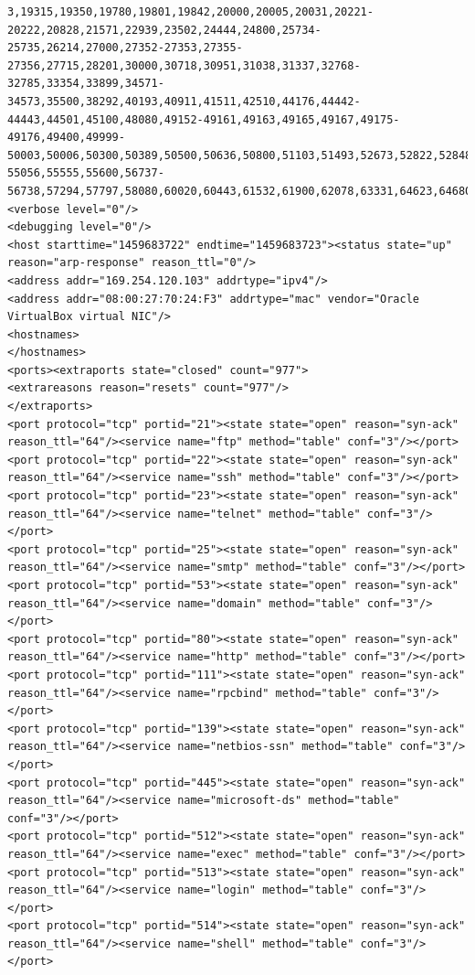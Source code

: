 \documentclass[10pt,a4paper]{report}
\begin{document}
\begin{verbatim}
3,19315,19350,19780,19801,19842,20000,20005,20031,20221-20222,20828,21571,22939,23502,24444,24800,25734-25735,26214,27000,27352-27353,27355-27356,27715,28201,30000,30718,30951,31038,31337,32768-32785,33354,33899,34571-34573,35500,38292,40193,40911,41511,42510,44176,44442-44443,44501,45100,48080,49152-49161,49163,49165,49167,49175-49176,49400,49999-50003,50006,50300,50389,50500,50636,50800,51103,51493,52673,52822,52848,52869,54045,54328,55055-55056,55555,55600,56737-56738,57294,57797,58080,60020,60443,61532,61900,62078,63331,64623,64680,65000,65129,65389"/>
<verbose level="0"/>
<debugging level="0"/>
<host starttime="1459683722" endtime="1459683723"><status state="up" reason="arp-response" reason_ttl="0"/>
<address addr="169.254.120.103" addrtype="ipv4"/>
<address addr="08:00:27:70:24:F3" addrtype="mac" vendor="Oracle VirtualBox virtual NIC"/>
<hostnames>
</hostnames>
<ports><extraports state="closed" count="977">
<extrareasons reason="resets" count="977"/>
</extraports>
<port protocol="tcp" portid="21"><state state="open" reason="syn-ack" reason_ttl="64"/><service name="ftp" method="table" conf="3"/></port>
<port protocol="tcp" portid="22"><state state="open" reason="syn-ack" reason_ttl="64"/><service name="ssh" method="table" conf="3"/></port>
<port protocol="tcp" portid="23"><state state="open" reason="syn-ack" reason_ttl="64"/><service name="telnet" method="table" conf="3"/></port>
<port protocol="tcp" portid="25"><state state="open" reason="syn-ack" reason_ttl="64"/><service name="smtp" method="table" conf="3"/></port>
<port protocol="tcp" portid="53"><state state="open" reason="syn-ack" reason_ttl="64"/><service name="domain" method="table" conf="3"/></port>
<port protocol="tcp" portid="80"><state state="open" reason="syn-ack" reason_ttl="64"/><service name="http" method="table" conf="3"/></port>
<port protocol="tcp" portid="111"><state state="open" reason="syn-ack" reason_ttl="64"/><service name="rpcbind" method="table" conf="3"/></port>
<port protocol="tcp" portid="139"><state state="open" reason="syn-ack" reason_ttl="64"/><service name="netbios-ssn" method="table" conf="3"/></port>
<port protocol="tcp" portid="445"><state state="open" reason="syn-ack" reason_ttl="64"/><service name="microsoft-ds" method="table" conf="3"/></port>
<port protocol="tcp" portid="512"><state state="open" reason="syn-ack" reason_ttl="64"/><service name="exec" method="table" conf="3"/></port>
<port protocol="tcp" portid="513"><state state="open" reason="syn-ack" reason_ttl="64"/><service name="login" method="table" conf="3"/></port>
<port protocol="tcp" portid="514"><state state="open" reason="syn-ack" reason_ttl="64"/><service name="shell" method="table" conf="3"/></port>

\end{verbatim}
\end{document}
